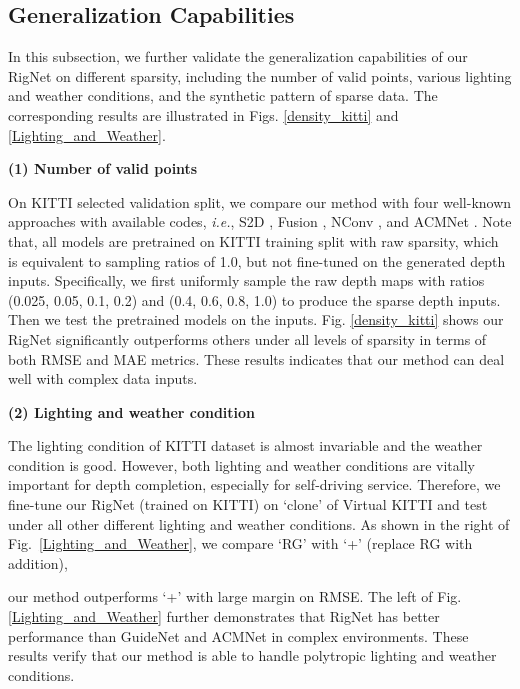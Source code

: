 \documentclass[runningheads]{llncs}
\begin{document}
\subsection{Generalization Capabilities}
In this subsection, we further validate the generalization capabilities of our RigNet on different sparsity, including the number of valid points, various lighting and weather conditions, and the synthetic pattern of sparse data. The corresponding results are illustrated in Figs. \ref{density_kitti} and \ref{Lighting_and_Weather}.

\noindent \textbf{(1) Number of valid points}

On KITTI selected validation split, we compare our method with four well-known approaches with available codes, \emph{i.e.}, S2D \cite{ma2018self}, Fusion \cite{vangansbeke2019}, NConv \cite{2020Confidence}, and ACMNet \cite{zhao2021adaptive}. Note that, all models are pretrained on KITTI training split with raw sparsity, which is equivalent to sampling ratios of 1.0, but not fine-tuned on the generated depth inputs. Specifically, we first uniformly sample the raw depth maps with ratios (0.025, 0.05, 0.1, 0.2) and (0.4, 0.6, 0.8, 1.0) to produce the sparse depth inputs. Then we test the pretrained models on the inputs. Fig. \ref{density_kitti} shows our RigNet significantly outperforms others under all levels of sparsity in terms of both RMSE and MAE metrics. These results indicates that our method can deal well with complex data inputs.

\noindent \textbf{(2) Lighting and weather condition}

The lighting condition of KITTI dataset is almost invariable and the weather condition is good. However, both lighting and weather conditions are vitally important for depth completion, especially for self-driving service. Therefore, we fine-tune our RigNet (trained on KITTI) on `clone' of Virtual KITTI \cite{gaidon2016virtual} and test under all other different lighting and weather conditions. As shown in the right of Fig.~\ref{Lighting_and_Weather}, we compare `RG' with `+' (replace RG with addition), 




\noindent our method outperforms `+' with large margin on RMSE. The left of Fig. \ref{Lighting_and_Weather} further demonstrates that RigNet has better performance than GuideNet \cite{tang2020learning} and ACMNet \cite{zhao2021adaptive} in complex environments. These results verify that our method is able to handle polytropic lighting and weather conditions.
\end{document}
